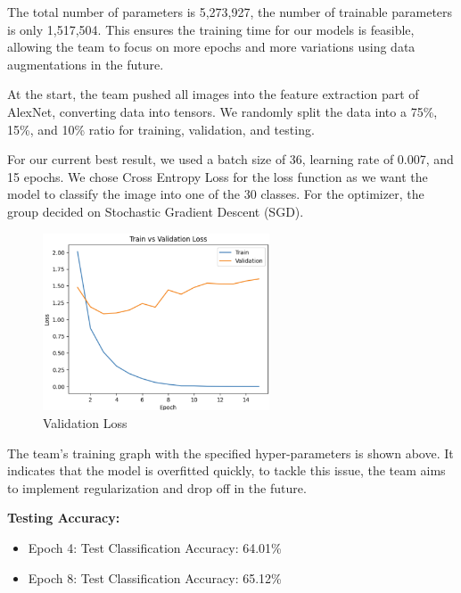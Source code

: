 \documentclass{article} %
\begin{document}
The total number of parameters is 5,273,927, the number of trainable parameters is only 1,517,504. This ensures the training time for our models is feasible, allowing the team to focus on more epochs and more variations using data augmentations in the future.

At the start, the team pushed all images into the feature extraction part of AlexNet, converting data into tensors. We randomly split the data into a 75\%, 15\%, and 10\% ratio for training, validation, and testing.

For our current best result, we used a batch size of 36, learning rate of 0.007, and 15 epochs. We chose Cross Entropy Loss for the loss function as we want the model to classify the image into one of the 30 classes. For the optimizer, the group decided on Stochastic Gradient Descent (SGD).

\begin{figure}[h]
    \begin{center}
    \includegraphics[width=0.6\textwidth]{figures/validationLossGraph.png}
    \end{center}
    \caption{Validation Loss}
\end{figure}

The team's training graph with the specified hyper-parameters is shown above. It indicates that the model is overfitted quickly, to tackle this issue, the team aims to implement regularization and drop off in the future.

\textbf{Testing Accuracy:}
\begin{itemize}
    \item Epoch 4: Test Classification Accuracy: 64.01\%
    \item Epoch 8: Test Classification Accuracy: 65.12\%
\end{itemize}
\end{document}
